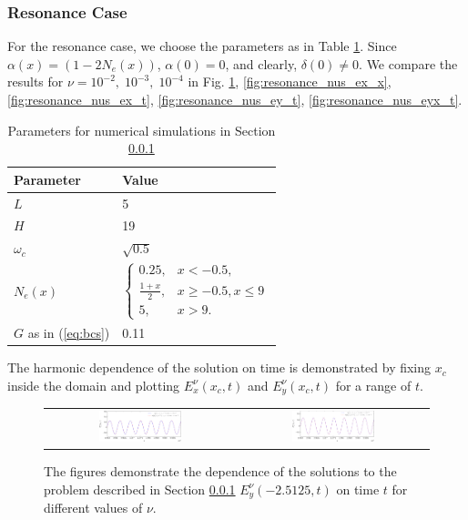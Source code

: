 \subsubsection{Resonance Case}
\label{sec:resn}
For the resonance case, we choose the parameters as in Table \ref{tab:parameters_resonance}. Since $\alpha(x)=(1-2N_e(x))$, $\alpha(0)=0$, and clearly, $\delta(0)\neq 0$. We compare the results for $\nu=10^{-2},\; 10^{-3},\; 10^{-4}$ in Fig. \ref{fig:resonance_nus_ey_x}, 
\ref{fig:resonance_nus_ex_x}, \ref{fig:resonance_nus_ex_t}, \ref{fig:resonance_nus_ey_t}, \ref{fig:resonance_nus_eyx_t}. 
\begin{table}[htb!]
\begin{tabular}{l|l}
Parameter & Value \\
\hline
$L$ & 5\\
$H$ & 19\\
$\omega_c$ &  $\sqrt{0.5}$\\
$N_e(x)$ &  $\left\{
 \begin{array}{lr}
  0.25, & x<-0.5,\\
  \frac{1+x}{2}, & x\geq -0.5, x\leq 9\\
  5, & x>9.
 \end{array}\right.$\\
 $G$ as in (\ref{eq:bcs}) & 0.11 \\
\end{tabular}
\caption{Parameters for numerical simulations in Section \ref{sec:resn}}
\label{tab:parameters_resonance}
\end{table}
The harmonic dependence of the solution on time is demonstrated by fixing $x_c$ inside the domain and plotting 
$E_x^{\nu}(x_c,t)$ and $E_y^{\nu}(x_c, t)$ for a range of $t$. 
\begin{figure}
\begin{tabular}{cc}
\includegraphics[width=0.45\textwidth]{pics_time_domain/res/ey_fixed_x-crop.pdf}&
\includegraphics[width=0.45\textwidth]{pics_time_domain/res/ey_fixed_x_1e3-crop.pdf}
 \end{tabular}
\caption{The figures demonstrate the dependence of the solutions to the problem described in Section \ref{sec:resn} 
$E_y^{\nu}(-2.5125,t)$ on time $t$ for different values of $\nu$. }
\label{fig:resonance_nus_ey_x}
\end{figure}
